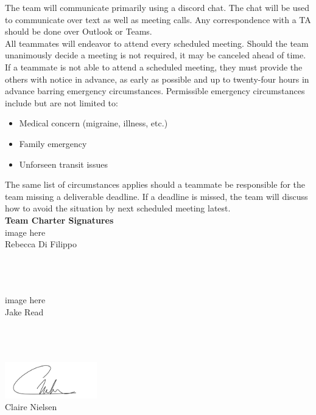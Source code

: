 \documentclass{article}
\begin{document}
The team will communicate primarily using a discord chat. The chat will be used to communicate over text as well as meeting calls. Any correspondence with a TA should be done over Outlook or Teams. \\

All teammates will endeavor to attend every scheduled meeting. Should the team unanimously decide a meeting is not required, it may be canceled ahead of time. If a teammate is not able to attend a scheduled meeting, they must provide the others with notice in advance, as early as possible and up to twenty-four hours in advance barring emergency circumstances. Permissible emergency circumstances include but are not limited to: \\

\begin{itemize}
    \item Medical concern (migraine, illness, etc.)
    \item Family emergency
    \item Unforseen transit issues \\
\end{itemize}

The same list of circumstances applies should a teammate be responsible for the team missing a deliverable deadline. If a deadline is missed, the team will discuss how to avoid the situation by next scheduled meeting latest. \\

\textbf{Team Charter Signatures}\\

image here\\
Rebecca Di Filippo \\ 
\date{\today}\\ \\ \\ 

image here\\
Jake Read\\
\date{\today }\\ \\ \\ 

\includegraphics[width=0.3\textwidth]{signature_claire}\\
Claire Nielsen\\
\date{\today}
\end{document}

